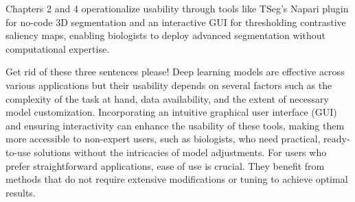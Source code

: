 \documentclass[./dissertation.tex]{subfiles}
\begin{document}
\textcolor{BulldogRed}{Chapters 2 and 4 operationalize usability through tools like TSeg’s Napari plugin for no-code 3D segmentation and an interactive GUI for thresholding contrastive saliency maps, enabling biologists to deploy advanced segmentation without computational expertise.}

\textcolor{Hedges}{Get rid of these three sentences please!} Deep learning models are effective across various applications but their usability depends on several factors such as the complexity of the task at hand, data availability, and the extent of necessary model customization. Incorporating an intuitive graphical user interface (GUI) and ensuring interactivity can enhance the usability of these tools, making them more accessible to non-expert users, such as biologists, who need practical, ready-to-use solutions without the intricacies of model adjustments. For users who prefer straightforward applications, ease of use is crucial. They benefit from methods that do not require extensive modifications or tuning to achieve optimal results.



\end{document}
